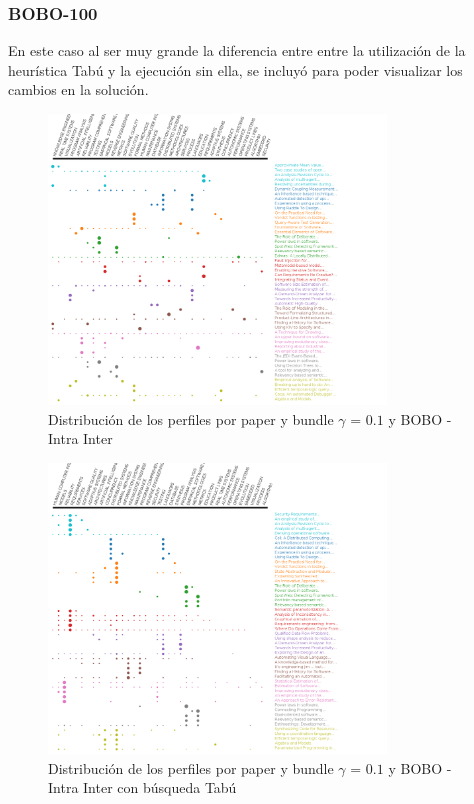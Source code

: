 \subsubsection{BOBO-100}
En este caso al ser muy grande la diferencia entre entre la utilización de la heurística Tabú y la ejecución sin ella,  se incluyó para poder visualizar los cambios en la solución.
\begin{figure}[H]
  \centering
    \includegraphics[width=0.8\textwidth]{resultados/papers/BOBO/INTRA_INTER/gamma-01.png}
  \caption{Distribución de los perfiles por paper y bundle $\gamma$ = $0.1$ y BOBO - Intra Inter}
  \label{res:img-papers-gamma01-bobo-intra-inter}
\end{figure}

\begin{figure}[H]
  \centering
    \includegraphics[width=0.8\textwidth]{resultados/papers/BOBO/INTRA_INTER/gamma-with-local-01.png}
  \caption{Distribución de los perfiles por paper y bundle $\gamma$ = $0.1$ y BOBO - Intra Inter con búsqueda Tabú}
  \label{res:img-papers-gamma01-bobo-intra-inter-tabu}
\end{figure}

